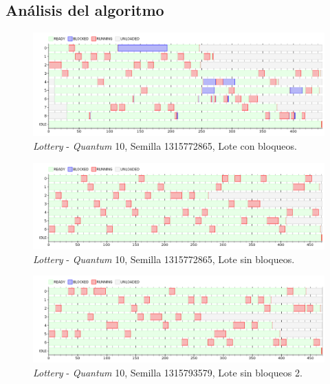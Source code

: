 \subsection{Análisis del algoritmo}
\begin{figure}[H]
\centering
\includegraphics[scale=0.5]{./graficos/out_ej_8.png}
\caption{\emph{Lottery} - \emph{Quantum} 10, Semilla 1315772865, Lote con bloqueos.}
\end{figure} 

\begin{figure}[H]
\centering
\includegraphics[scale=0.5]{./graficos/out_ej_8_2.png}
\caption{\emph{Lottery} - \emph{Quantum} 10, Semilla 1315772865, Lote sin bloqueos.}
\end{figure} 

\begin{figure}[H]
\centering
\includegraphics[scale=0.5]{./graficos/out_ej_8_3.png}
\caption{\emph{Lottery} - \emph{Quantum} 10, Semilla 1315793579, Lote sin bloqueos 2.}
\end{figure} 

